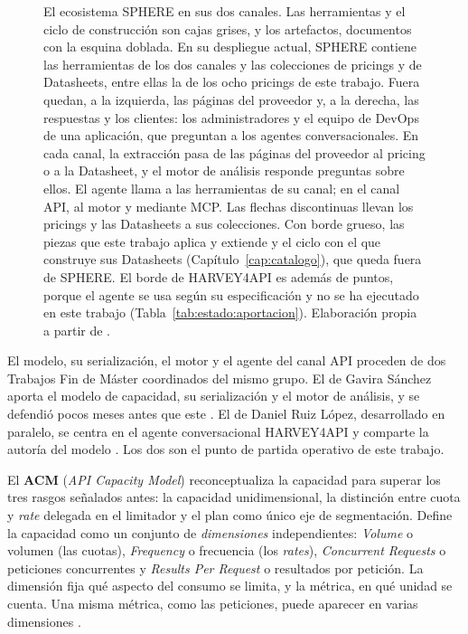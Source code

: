 \begin{figure}[tbp]
\centering

\caption[El ecosistema SPHERE en sus dos canales]{El ecosistema SPHERE en sus dos canales. Las herramientas y el ciclo de construcción son cajas grises, y los artefactos, documentos con la esquina doblada. En su despliegue actual, SPHERE contiene las herramientas de los dos canales y las colecciones de pricings y de Datasheets, entre ellas la de los ocho pricings de este trabajo. Fuera quedan, a la izquierda, las páginas del proveedor y, a la derecha, las respuestas y los clientes: los administradores y el equipo de DevOps de una aplicación, que preguntan a los agentes conversacionales. En cada canal, la extracción pasa de las páginas del proveedor al pricing o a la Datasheet, y el motor de análisis responde preguntas sobre ellos. El agente llama a las herramientas de su canal; en el canal API, al motor y mediante MCP. Las flechas discontinuas llevan los pricings y las Datasheets a sus colecciones. Con borde grueso, las piezas que este trabajo aplica y extiende y el ciclo con el que construye sus Datasheets (Capítulo~\ref{cap:catalogo}), que queda fuera de SPHERE. El borde de HARVEY4API es además de puntos, porque el agente se usa según su especificación y no se ha ejecutado en este trabajo (Tabla~\ref{tab:estado:aportacion}). Elaboración propia a partir de \citep{gavira2026tfm,ruizlopez2026tfm,cavero2026pricingintelligence,cavero2025amint,garciafernandez2025ipricing,sphere}.}
\label{fig:estado:ecosistema}
\end{figure}

El modelo, su serialización, el motor y el agente del canal API proceden
de dos Trabajos Fin de Máster coordinados del mismo grupo. El de Gavira Sánchez aporta el modelo de
capacidad, su serialización y el motor de análisis, y se defendió pocos
meses antes que este \citep{gavira2026tfm}. El de Daniel Ruiz López,
desarrollado en paralelo, se centra en el agente conversacional
HARVEY4API y comparte la autoría del modelo \citep{ruizlopez2026tfm}.
Los dos son el punto de partida operativo de este trabajo.

El \textbf{ACM} (\textit{API Capacity Model}) reconceptualiza la
capacidad para superar los tres rasgos señalados antes: la capacidad unidimensional, la
distinción entre cuota y \textit{rate} delegada en el limitador y el plan como
único eje de segmentación. Define la capacidad como un conjunto
de \textit{dimensiones} independientes: \textit{Volume} o volumen (las
cuotas), \textit{Frequency} o frecuencia (los \textit{rates}),
\textit{Concurrent Requests} o peticiones concurrentes y \textit{Results
Per Request} o resultados por petición. La dimensión fija qué aspecto del consumo
se limita, y la métrica, en qué unidad se cuenta. Una misma métrica,
como las peticiones, puede aparecer en varias dimensiones
\citep{gavira2026tfm}.

